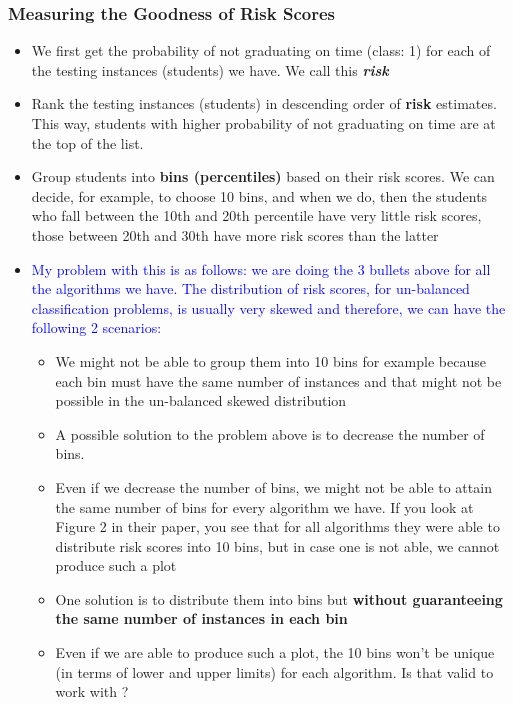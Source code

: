 \documentclass{article}
\begin{document}
\subsubsection{Measuring the Goodness of Risk Scores}
\begin{itemize}
\item We first get the probability of not graduating on time (class: 1) for each of the testing instances (students) we have. We call this \textbf{\textit{risk}}

\item Rank the testing instances (students) in descending order of \textbf{risk} estimates. This way, students with higher probability of not graduating on time are at the top of the list.

\item Group students into \textbf{bins (percentiles)} based on their risk scores. We can decide, for example, to choose 10 bins, and when we do, then the students who fall between the 10th and 20th percentile have very little risk scores, those between 20th and 30th have more risk scores than the latter 

\item \textcolor{blue}{My problem with this is as follows: we are doing the 3 bullets above for all the algorithms we have. The distribution of risk scores, for un-balanced classification problems, is usually very skewed and therefore, we can have the following 2 scenarios:}
\begin{itemize}
\item We might not be able to group them into 10 bins for example because each bin must have the same number of instances and that might not be possible in the un-balanced skewed distribution
\item A possible solution to the problem above is to decrease the number of bins.
\item Even if we decrease the number of bins, we might not be able to attain the same number of bins for every algorithm we have. If you look at Figure 2 in their paper, you see that for all algorithms they were able to distribute risk scores into 10 bins, but in case one is not able, we cannot produce such a plot
\item One solution is to distribute them into bins but \textbf{without guaranteeing the same number of instances in each bin  }
\item Even if we are able to produce such a plot, the 10 bins won't be unique (in terms of lower and upper limits) for each algorithm. Is that valid to work with ?  
\end{itemize}


\end{itemize}
\end{document}
